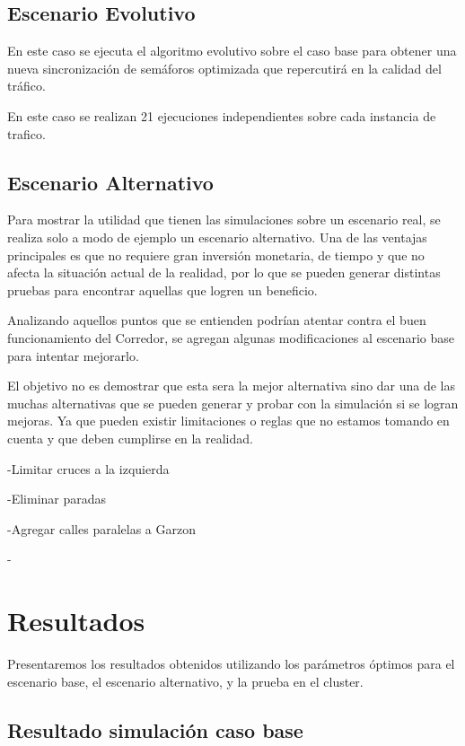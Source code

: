 \subsection{Escenario Evolutivo }
En este caso se ejecuta el algoritmo evolutivo sobre el caso base para obtener una nueva sincronización de semáforos optimizada que repercutirá en la calidad del tráfico.

En este caso se realizan 21 ejecuciones independientes sobre cada instancia de trafico.


\subsection{Escenario Alternativo}

Para mostrar la utilidad que tienen las simulaciones sobre un escenario real, se realiza solo a modo de ejemplo un escenario alternativo. Una de las ventajas principales es que no requiere gran inversión monetaria, de tiempo y que no afecta la situación actual de la realidad, por lo que se pueden generar distintas pruebas para encontrar aquellas que logren un beneficio.

Analizando aquellos puntos que se entienden podrían atentar contra el buen funcionamiento del Corredor, se agregan algunas modificaciones al escenario base para intentar mejorarlo. 

El objetivo no es demostrar que esta sera la mejor alternativa sino dar una de las muchas alternativas que se pueden generar y probar con la simulación si se logran mejoras. Ya que pueden existir limitaciones o reglas que no estamos tomando en cuenta y que deben cumplirse en la realidad.

-Limitar cruces a la izquierda

-Eliminar paradas

-Agregar calles paralelas a Garzon

-


\section{Resultados}
Presentaremos los resultados obtenidos  utilizando los parámetros óptimos  para el escenario base, el escenario alternativo, y la prueba en el cluster.

\subsection{Resultado simulación caso base}

